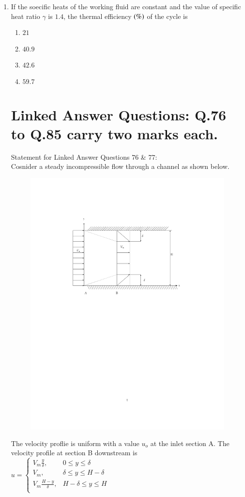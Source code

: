 \documentclass[journal,12pt,onecolumn,article]{IEEEtran}
\theoremstyle{remark}
\begin{document}
\begin{enumerate}
\begin{enumerate}
		\end{enumerate}
	\item If the soecific heats of the working fluid are constant and the value of specific heat ratio $\gamma$ is $1.4$, the thermal efficiency $\left(\%\right)$ of the cycle is 
		\begin{enumerate}
			\item $21$
			\item $40.9$
			\item $42.6$
			\item $59.7$
		\end{enumerate}
		\section*{Linked Answer Questions: Q.76 to Q.85 carry two marks each.}
		Statement for Linked Answer Questions 76 \& 77: \\
		Cosnider a steady incompressible flow through a channel as shown below. \\
			\begin{figure}[H]
	\centering
	\includegraphics[width=0.7\linewidth]{figs/fig76/main.pdf}
\end{figure}
\vspace{-180pt}

		The velocity proflie is uniform with a value $u_o$ at the inlet section A. The velocity profile at section B downstream is \\
			$u = 
			\begin{cases}
				V_m\frac{y}{\delta}, & 0\le y\le \delta \\
				V_m, & \delta \le y \le H-\delta \\
				V_m\frac{H-y}{\delta}, & H-\delta \le y \le H \\
			\end{cases}$
	

\end{enumerate}
\end{document}
